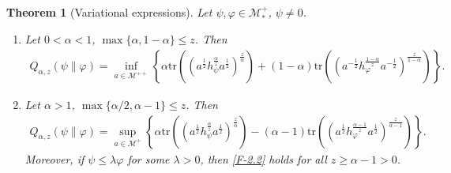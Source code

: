 \documentclass[12pt]{article}
\newtheorem{theorem}{Theorem}[section]
\theoremstyle{definition}
\theoremstyle{remark}
\numberwithin{equation}{section}
\def\Me{\mathcal M}
\def\Tr{\mathrm{tr}}
\def\ffi{\varphi}
\begin{document}
\begin{theorem}[Variational expressions]\label{thm:variational} Let $\psi,\varphi\in \Me_*^+$, $\psi\ne 0$. 
\begin{enumerate}
\item[(i)] Let $0<\alpha<1$, $\max\{\alpha,1-\alpha\}\le z$. Then
\begin{align}\label{F-2.1}
Q_{\alpha,z}(\psi\|\varphi)=\inf_{a\in \Me^{++}}\left\{\alpha
\Tr\left((a^{\frac12}h_\psi^{\frac{\alpha}{z}}a^{\frac12})^{\frac{z}{\alpha}}\right)+(1-\alpha)
\Tr\left((a^{-\frac12}h_\varphi^{\frac{1-\alpha}{z}}a^{-\frac12})^{\frac{z}{1-\alpha}}\right) \right\}.
\end{align}

\item[(ii)] Let $\alpha>1$, $\max\{\alpha/2,\alpha-1\}\le z$. Then
\begin{align}\label{F-2.2}
Q_{\alpha,z}(\psi\|\varphi)=\sup_{a\in \Me^+} \left\{\alpha
\Tr\left((a^{\frac12}h_\psi^{\frac{\alpha}{z}}a^{\frac12})^{\frac{z}{\alpha}}\right)-(\alpha-1)
\Tr\left((a^{\frac12}h_\varphi^{\frac{\alpha-1}{z}}a^{\frac12})^{\frac{z}{\alpha-1}}\right) \right\}.
\end{align}
Moreover, if $\psi\le\lambda\ffi$ for some $\lambda>0$, then \eqref{F-2.2} holds for all
$z\ge\alpha-1>0$.
\end{enumerate}
\end{theorem}
\end{document}
